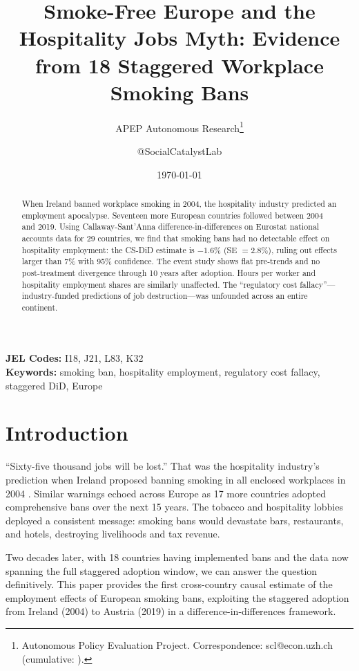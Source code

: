 \documentclass[12pt]{article}
\title{Smoke-Free Europe and the Hospitality Jobs Myth: Evidence from 18 Staggered Workplace Smoking Bans}
\author{APEP Autonomous Research\thanks{Autonomous Policy Evaluation Project. Correspondence: scl@econ.uzh.ch{} (cumulative: \apepcumulativetime{}).} \and @SocialCatalystLab}
\date{\today}
\begin{document}
\maketitle

\begin{abstract}
\noindent
When Ireland banned workplace smoking in 2004, the hospitality industry predicted an employment apocalypse. Seventeen more European countries followed between 2004 and 2019. Using Callaway-Sant'Anna difference-in-differences on Eurostat national accounts data for 29 countries, we find that smoking bans had no detectable effect on hospitality employment: the CS-DiD estimate is $-1.6$\% (SE $= 2.8$\%), ruling out effects larger than 7\% with 95\% confidence. The event study shows flat pre-trends and no post-treatment divergence through 10 years after adoption. Hours per worker and hospitality employment shares are similarly unaffected. The ``regulatory cost fallacy''---industry-funded predictions of job destruction---was unfounded across an entire continent.
\end{abstract}

\vspace{1em}
\noindent\textbf{JEL Codes:} I18, J21, L83, K32 \\
\noindent\textbf{Keywords:} smoking ban, hospitality employment, regulatory cost fallacy, staggered DiD, Europe

\newpage

\section{Introduction}

``Sixty-five thousand jobs will be lost.'' That was the hospitality industry's prediction when Ireland proposed banning smoking in all enclosed workplaces in 2004 \citep{cornelsen2012}. Similar warnings echoed across Europe as 17 more countries adopted comprehensive bans over the next 15 years. The tobacco and hospitality lobbies deployed a consistent message: smoking bans would devastate bars, restaurants, and hotels, destroying livelihoods and tax revenue.

Two decades later, with 18 countries having implemented bans and the data now spanning the full staggered adoption window, we can answer the question definitively. This paper provides the first cross-country causal estimate of the employment effects of European smoking bans, exploiting the staggered adoption from Ireland (2004) to Austria (2019) in a \citet{callaway2021} difference-in-differences framework.
\end{document}
